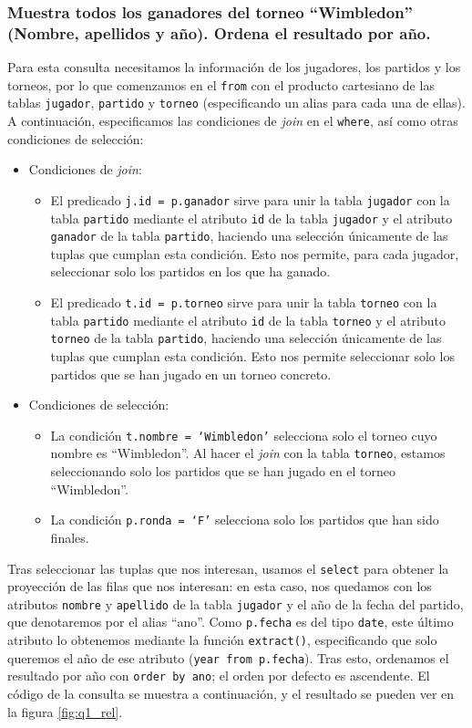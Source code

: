 \documentclass[11pt]{opticajnl}
\begin{document}
\subsubsection{Muestra todos los ganadores del torneo ``Wimbledon'' (Nombre, apellidos y año). Ordena el resultado por año.}

Para esta consulta necesitamos la información de los jugadores, los partidos y los torneos, por lo que comenzamos en el \texttt{from} con el producto cartesiano de las tablas \texttt{jugador}, \texttt{partido} y \texttt{torneo} (especificando un alias para cada una de ellas). A continuación, especificamos las condiciones de \textit{join} en el \texttt{where}, así como otras condiciones de selección: 
\begin{itemize}
\item Condiciones de \textit{join}:
\begin{itemize}
\item El predicado \texttt{j.id = p.ganador} sirve para unir la tabla \texttt{jugador} con la tabla \texttt{partido} mediante el atributo \texttt{id} de la tabla \texttt{jugador} y el atributo \texttt{ganador} de la tabla \texttt{partido}, haciendo una selección únicamente de las tuplas que cumplan esta condición. Esto nos permite, para cada jugador, seleccionar solo los partidos en los que ha ganado.
\item El predicado \texttt{t.id = p.torneo} sirve para unir la tabla \texttt{torneo} con la tabla \texttt{partido} mediante el atributo \texttt{id} de la tabla \texttt{torneo} y el atributo \texttt{torneo} de la tabla \texttt{partido}, haciendo una selección únicamente de las tuplas que cumplan esta condición. Esto nos permite seleccionar solo los partidos que se han jugado en un torneo concreto.
\end{itemize}
\item Condiciones de selección:
\begin{itemize}
\item La condición \texttt{t.nombre = `Wimbledon'} selecciona solo el torneo cuyo nombre es ``Wimbledon''. Al hacer el \textit{join} con la tabla \texttt{torneo}, estamos seleccionando solo los partidos que se han jugado en el torneo ``Wimbledon''.
\item La condición \texttt{p.ronda = `F'} selecciona solo los partidos que han sido finales.
\end{itemize}
\end{itemize}

Tras seleccionar las tuplas que nos interesan, usamos el \texttt{select} para obtener la proyección de las filas que nos interesan: en esta caso, nos quedamos con los atributos \texttt{nombre} y \texttt{apellido} de la tabla \texttt{jugador} y el año de la fecha del partido, que denotaremos por el alias ``ano''. Como \texttt{p.fecha} es del tipo \texttt{date}, este último atributo lo obtenemos mediante la función \texttt{extract()}, especificando que solo queremos el año de ese atributo (\texttt{year from p.fecha}). Tras esto, ordenamos el resultado por año con \texttt{order by ano}; el orden por defecto es ascendente. El código de la consulta se muestra a continuación, y el resultado se pueden ver en la figura \ref{fig:q1_rel}.
\end{document}
